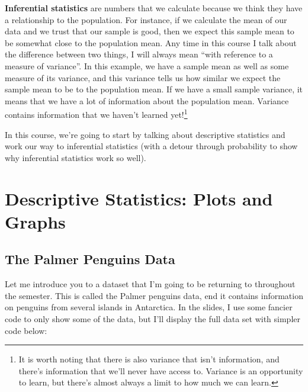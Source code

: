 \documentclass[
  letterpaper,
  DIV=11,
  numbers=noendperiod,
  oneside]{scrreprt}
\begin{document}
\textbf{Inferential statistics} are numbers that we calculate because we
think they have a relationship to the population. For instance, if we
calculate the mean of our data and we trust that our sample is good,
then we expect this sample mean to be somewhat close to the population
mean. Any time in this course I talk about the difference between two
things, I will always mean ``with reference to a measure of variance''.
In this example, we have a sample mean as well as some measure of its
variance, and this variance tells us how similar we expect the sample
mean to be to the population mean. If we have a small sample variance,
it means that we have a lot of information about the population mean.
Variance contains information that we haven't learned
yet!\footnote{It is worth noting that there is also variance that isn't
  information, and there's information that we'll never have access to.
  Variance is an opportunity to learn, but there's almost always a limit
  to how much we can learn.}{}

In this course, we're going to start by talking about descriptive
statistics and work our way to inferential statistics (with a detour
through probability to show why inferential statistics work so well).

\hypertarget{descriptive-statistics-plots-and-graphs}{%
\section{Descriptive Statistics: Plots and
Graphs}\label{descriptive-statistics-plots-and-graphs}}

\hypertarget{the-palmer-penguins-data}{%
\subsection{The Palmer Penguins Data}\label{the-palmer-penguins-data}}

Let me introduce you to a dataset that I'm going to be returning to
throughout the semester. This is called the Palmer penguins data, end it
contains information on penguins from several islands in Antarctica. In
the slides, I use some fancier code to only show some of the data, but
I'll display the full data set with simpler code below:
\end{document}
